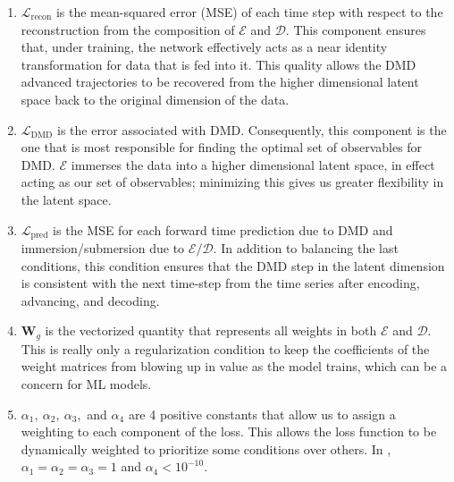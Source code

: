 \begin{enumerate}
    \item $\mathcal{L}_{\text{recon}}$ is the mean-squared error (MSE) of each time step
    with respect to the reconstruction from the composition of $\mathcal{E}$ and $\mathcal{D}$. 
    This component ensures that, under training, the network effectively acts as a near identity 
    transformation for data that is fed into it. This quality allows the DMD advanced trajectories 
    to be recovered from the higher dimensional latent space back to the original dimension of 
    the data.
    
    \item $\mathcal{L}_{\text{DMD}}$ is the error associated with DMD. Consequently, this 
    component is the one that is most responsible for finding the optimal set of observables for DMD.
    $\mathcal{E}$ immerses the data into a higher dimensional latent space, in effect acting as our 
    set of observables; minimizing this gives us greater flexibility in the latent space.
    
    \item $\mathcal{L}_{\text{pred}}$ is the MSE for each forward time prediction due to DMD and 
    immersion/submersion due to $\mathcal{E}/\mathcal{D}$. In addition to balancing the last conditions, 
    this condition ensures that the DMD step in the latent dimension is consistent with the next time-step from 
    the time series after encoding, advancing, and decoding.  
    
    \item $\boldsymbol{W}_g$ is the vectorized quantity that represents all weights in both $\mathcal{E}$
    and $\mathcal{D}$. This is really only a regularization condition to keep the coefficients of the 
    weight matrices from blowing up in value as the model trains, which can be a 
    concern for ML models.
    
    \item $\alpha_1,\ \alpha_2,\ \alpha_3,$ and $\alpha_4$ are 4 positive constants that allow us to assign a 
    weighting to each component of the loss. This allows the loss function to be dynamically weighted to 
    prioritize some conditions over others. In \cite{lago}, $\alpha_1 = \alpha_2 = \alpha_3 = 1$ and 
    $\alpha_4 < 10^{-10}$.
\end{enumerate}

